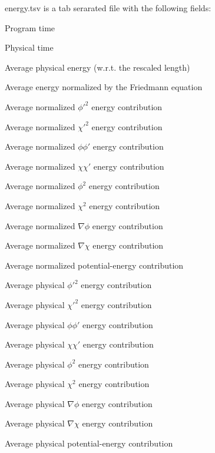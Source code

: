 energy.tsv is a tab serarated file with the following fields:

\begin{DoxyItemize}
\item Program time \item Physical time \item Average physical energy (w.r.t. the rescaled length) \item Average energy normalized by the Friedmann equation \item Average normalized $ \phi'^2 $ energy contribution \item Average normalized $ \chi'^2 $ energy contribution \item Average normalized $ \phi\phi' $ energy contribution \item Average normalized $ \chi\chi' $ energy contribution \item Average normalized $ \phi^2 $ energy contribution \item Average normalized $ \chi^2 $ energy contribution \item Average normalized $ \nabla \phi $ energy contribution \item Average normalized $ \nabla \chi $ energy contribution \item Average normalized potential-\/energy contribution \item Average physical $ \phi'^2 $ energy contribution \item Average physical $ \chi'^2 $ energy contribution \item Average physical $ \phi\phi' $ energy contribution \item Average physical $ \chi\chi' $ energy contribution \item Average physical $ \phi^2 $ energy contribution \item Average physical $ \chi^2 $ energy contribution \item Average physical $ \nabla \phi $ energy contribution \item Average physical $ \nabla \chi $ energy contribution \item Average physical potential-\/energy contribution \end{DoxyItemize}
